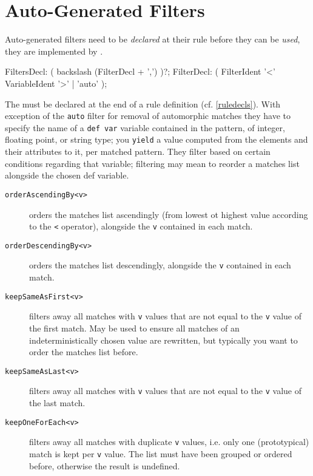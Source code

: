 \section{Auto-Generated Filters}

Auto-generated filters need to be \emph{declared} at their rule before they can be \emph{used}, they are implemented by \GrG.

\begin{rail}
  FiltersDecl: ( backslash (FilterDecl + ',') )?;
  FilterDecl: ( FilterIdent '<' VariableIdent '>' | 'auto' );
\end{rail}

The  must be declared at the end of a rule definition (cf. \ref{ruledecls}).
With exception of the \texttt{auto} filter for removal of automorphic matches they have to specify the name of a \texttt{def var} variable contained in the pattern, of integer, floating point, or string type; you \texttt{yield} a value computed from the elements and their attributes to it, per matched pattern.
They filter based on certain conditions regarding that variable; filtering may mean to reorder a matches list alongside the chosen def variable.

\begin{description}
\item[\texttt{orderAscendingBy<v>}] orders the matches list ascendingly (from lowest ot highest value according to the \verb#<# operator), alongside the \texttt{v} contained in each match.
\item[\texttt{orderDescendingBy<v>}] orders the matches list descendingly, alongside the \texttt{v} contained in each match.
\item[\texttt{keepSameAsFirst<v>}] filters away all matches with \texttt{v} values that are not equal to the \texttt{v} value of the first match. May be used to ensure all matches of an indeterministically chosen value are rewritten, but typically you want to order the matches list before.
\item[\texttt{keepSameAsLast<v>}] filters away all matches with \texttt{v} values that are not equal to the \texttt{v} value of the last match.
\item[\texttt{keepOneForEach<v>}] filters away all matches with duplicate \texttt{v} values, i.e. only one (prototypical) match is kept per \texttt{v} value. The list must have been grouped or ordered before, otherwise the result is undefined.
\end{description}
 

